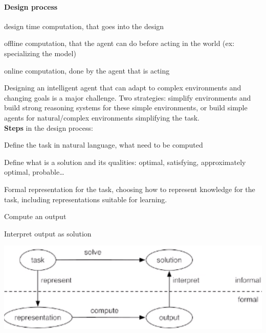 \documentclass[10pt]{report}
\begin{document}
\paragraph{Design process}
\begin{list}{}{}
	\item design time computation, that goes into the design
	\item offline computation, that the agent can do before acting in the world (ex: specializing the model)
	\item online computation, done by the agent that is acting
\end{list}
Designing an intelligent agent that can adapt to complex environments and changing goals is a major challenge. Two strategies: simplify environments and build strong reasoning systems for these simple environments, or build simple agents for natural/complex environments simplifying the task.\\
\textbf{Steps} in the design process:
\begin{list}{}{}
	\item Define the task in natural language, what need to be computed
	\item Define what is a solution and its qualities: optimal, satisfying, approximately optimal, probable\ldots
	\item Formal representation for the task, choosing how to represent knowledge for the task, including representations suitable for learning.
	\item Compute an output
	\item Interpret output as solution
\end{list}
\begin{center}
	\includegraphics[scale=0.5]{2.png}
\end{center}
\end{document}
